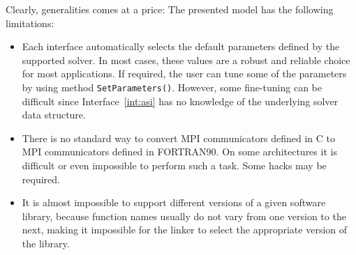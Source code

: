 \documentclass[acmtocl]{acmtrans2m}
\begin{document}
Clearly,  generalities comes at a price: The presented model has the following
limitations:
\begin{itemize}
\item 
Each interface automatically selects the default parameters defined by the
supported solver. In most cases, these values are a robust and reliable choice
for most applications. If required, the user can tune some of the parameters
by using method \verb!SetParameters()!. However, some fine-tuning can be
difficult since Interface~\ref{int:asi} has no knowledge of the underlying
solver data structure.

\item There
  is no standard way to 
  convert MPI communicators defined in C to MPI communicators defined
  in FORTRAN90. On some architectures it is difficult or even
  impossible to perform such a task. Some hacks may be required.

\item 
It is almost impossible to support different versions of a given software
library, because
function names usually do not vary from one version to the
next, making it impossible for the linker to select the
  appropriate version of the library.

%
%
\end{itemize}

%
\end{document}
